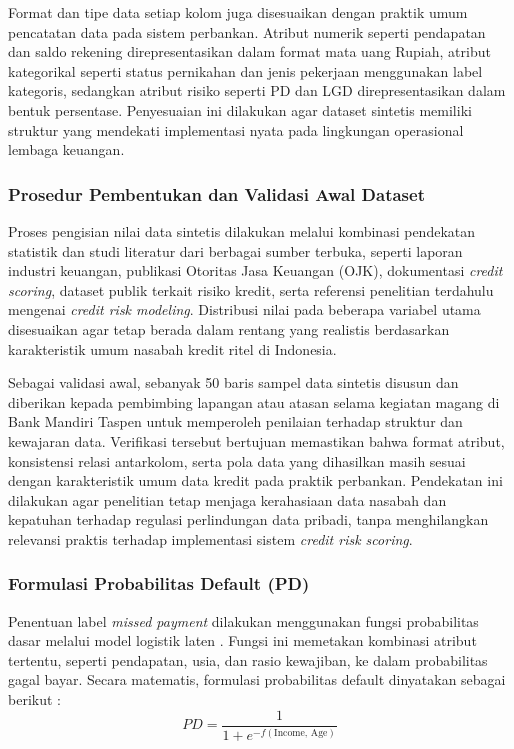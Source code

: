 Format dan tipe data setiap kolom juga disesuaikan dengan praktik umum pencatatan data pada sistem perbankan. Atribut numerik seperti pendapatan dan saldo rekening direpresentasikan dalam format mata uang Rupiah, atribut kategorikal seperti status pernikahan dan jenis pekerjaan menggunakan label kategoris, sedangkan atribut risiko seperti PD dan LGD direpresentasikan dalam bentuk persentase. Penyesuaian ini dilakukan agar dataset sintetis memiliki struktur yang mendekati implementasi nyata pada lingkungan operasional lembaga keuangan.

\subsubsection{Prosedur Pembentukan dan Validasi Awal Dataset}
Proses pengisian nilai data sintetis dilakukan melalui kombinasi pendekatan statistik dan studi literatur dari berbagai sumber terbuka, seperti laporan industri keuangan, publikasi Otoritas Jasa Keuangan (OJK), dokumentasi \textit{credit scoring}, dataset publik terkait risiko kredit, serta referensi penelitian terdahulu mengenai \textit{credit risk modeling}. Distribusi nilai pada beberapa variabel utama disesuaikan agar tetap berada dalam rentang yang realistis berdasarkan karakteristik umum nasabah kredit ritel di Indonesia.

Sebagai validasi awal, sebanyak 50 baris sampel data sintetis disusun dan diberikan kepada pembimbing lapangan atau atasan selama kegiatan magang di Bank Mandiri Taspen untuk memperoleh penilaian terhadap struktur dan kewajaran data. Verifikasi tersebut bertujuan memastikan bahwa format atribut, konsistensi relasi antarkolom, serta pola data yang dihasilkan masih sesuai dengan karakteristik umum data kredit pada praktik perbankan. Pendekatan ini dilakukan agar penelitian tetap menjaga kerahasiaan data nasabah dan kepatuhan terhadap regulasi perlindungan data pribadi, tanpa menghilangkan relevansi praktis terhadap implementasi sistem \textit{credit risk scoring}.

\subsubsection{Formulasi Probabilitas Default (PD)}
Penentuan label \textit{missed payment} dilakukan menggunakan fungsi probabilitas dasar melalui model logistik laten \cite{sarjono2025adaptive}. Fungsi ini memetakan kombinasi atribut tertentu, seperti pendapatan, usia, dan rasio kewajiban, ke dalam probabilitas gagal bayar. Secara matematis, formulasi probabilitas default dinyatakan sebagai berikut \cite{mathworks2025hosmer}:
\begin{equation}
    PD = \frac{1}{1 + e^{-f(\text{Income, Age})}}
\end{equation}


